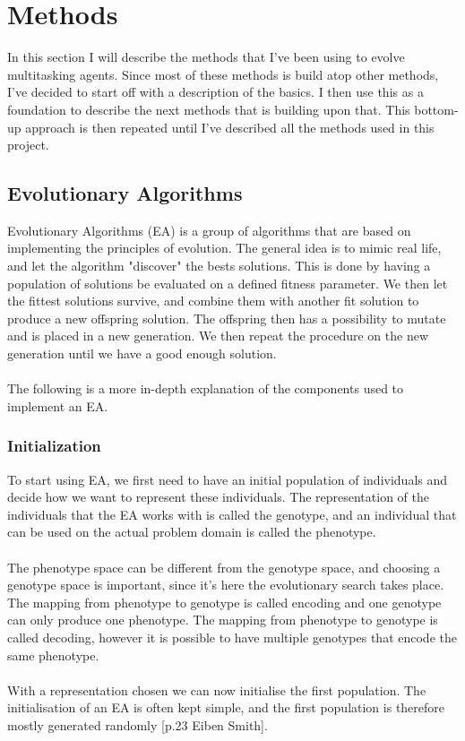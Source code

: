 \documentclass[11pt, a4paper]{article}
\begin{document}
\author{Mads Anthony}
\section{Methods}
In this section I will describe the methods that I've been using to evolve multitasking agents. Since most of these methods is build atop other methods, I've decided to start off with a description of the basics. I then use this as a foundation to describe the next methods that is building upon that. This bottom-up approach is then repeated until I've described all the methods used in this project.
\subsection{Evolutionary Algorithms}
Evolutionary Algorithms (EA) is a group of algorithms that are based on implementing the principles of evolution. The general idea is to mimic real life, and let the algorithm "discover" the bests solutions. This is done by having a population of solutions be evaluated on a defined fitness parameter. We then let the fittest solutions survive, and combine them with another fit solution to produce a new offspring solution. The offspring then has a possibility to mutate and is placed in a new generation. We then repeat the procedure on the new generation until we have a good enough solution.
\\
\\
The following is a more in-depth explanation of the components used to implement an EA.
\subsubsection{Initialization}
To start using EA, we first need to have an initial population of individuals and decide how we want to represent these individuals. The representation of the individuals that the EA works with is called the genotype, and an individual that can be used on the actual problem domain is called the phenotype.
\\
\\
The phenotype space can be different from the genotype space, and choosing a genotype space is important, since it's here the evolutionary search takes place. The mapping from phenotype to genotype is called encoding and one genotype can only produce one phenotype. The mapping from phenotype to genotype is called decoding, however it is possible to have multiple genotypes that encode the same phenotype.
\\
\\
With a representation chosen we can now initialise the first population. The initialisation of an EA is often kept simple, and the first population is therefore mostly generated randomly [p.23 Eiben Smith].
\end{document}
